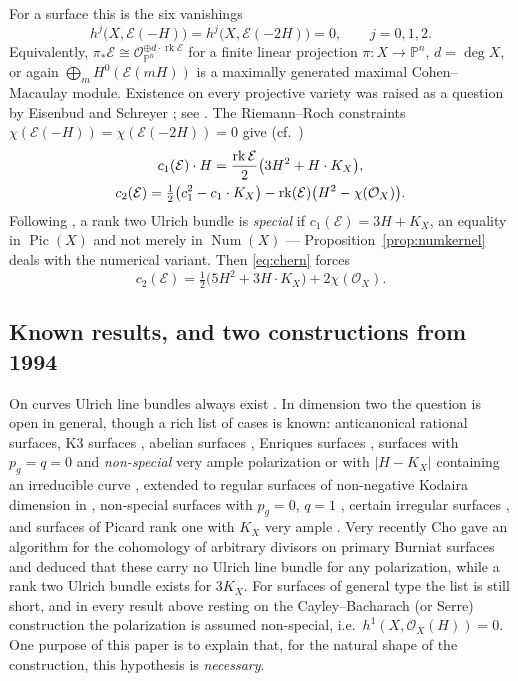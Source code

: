 \documentclass{amsart}
\theoremstyle{definition}
\newcommand{\OO}{\mathcal{O}}
\newcommand{\EE}{\mathcal{E}}
\newcommand{\PP}{\mathbb{P}}
\newcommand{\Num}{\operatorname{Num}}
\newcommand{\Pic}{\operatorname{Pic}}
\newcommand{\rk}{\operatorname{rk}}
\begin{document}
For a surface this is the six vanishings
\begin{equation}\label{eq:ulrich-vanishing}
h^j\bigl(X,\EE(-H)\bigr)=h^j\bigl(X,\EE(-2H)\bigr)=0,\qquad j=0,1,2 .
\end{equation}
Equivalently, $\pi_*\EE\cong\OO_{\PP^n}^{\oplus d\cdot\rk\EE}$ for a finite linear projection $\pi:X\to\PP^n$, $d=\deg X$, or again $\bigoplus_mH^0(\EE(mH))$ is a maximally generated maximal Cohen--Macaulay module. Existence on every projective variety was raised as a question by Eisenbud and Schreyer \cite{ES03}; see \cite{Bea18,Cos17}. The Riemann--Roch constraints $\chi(\EE(-H))=\chi(\EE(-2H))=0$ give (cf.\ \cite[\S2]{Cas17})
\begin{gather}
c_1(\EE)\cdot H=\frac{\rk\EE}{2}\bigl(3H^2+H\cdot K_X\bigr),\label{eq:chern}\\
c_2(\EE)=\tfrac12\bigl(c_1^2-c_1\cdot K_X\bigr)-\rk(\EE)\bigl(H^2-\chi(\OO_X)\bigr).\notag
\end{gather}
Following \cite{ES03,Cas17}, a rank two Ulrich bundle is \emph{special} if $c_1(\EE)=3H+K_X$, an equality in $\Pic(X)$ and not merely in $\Num(X)$ --- Proposition~\ref{prop:numkernel} deals with the numerical variant. Then \eqref{eq:chern} forces
\begin{equation}\label{eq:c2special}
c_2(\EE)=\tfrac12\bigl(5H^2+3H\cdot K_X\bigr)+2\chi(\OO_X).
\end{equation}

\subsection{Known results, and two constructions from 1994}
On curves Ulrich line bundles always exist \cite{ES03}. In dimension two the question is open in general, though a rich list of cases is known: anticanonical rational surfaces, K3 surfaces \cite{AFO17,Fae19}, abelian surfaces \cite{Bea16}, Enriques surfaces \cite{BN18}, surfaces with $p_g=q=0$ and \emph{non-special} very ample polarization \cite{Cas17} or with $|H-K_X|$ containing an irreducible curve \cite{Bea16b}, extended to regular surfaces of non-negative Kodaira dimension in \cite{Cas22}, non-special surfaces with $p_g=0$, $q=1$ \cite{Cas19}, certain irregular surfaces \cite{Lop21}, and surfaces of Picard rank one with $K_X$ very ample \cite{BP24}. Very recently Cho \cite{Cho26} gave an algorithm for the cohomology of arbitrary divisors on primary Burniat surfaces and deduced that these carry no Ulrich line bundle for any polarization, while a rank two Ulrich bundle exists for $3K_X$. For surfaces of general type the list is still short, and in every result above resting on the Cayley--Bacharach (or Serre) construction the polarization is assumed non-special, i.e.\ $h^1(X,\OO_X(H))=0$. One purpose of this paper is to explain that, for the natural shape of the construction, this hypothesis is \emph{necessary}.
\end{document}
